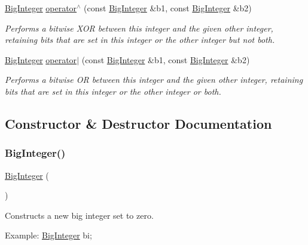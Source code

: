 \begin{DoxyCompactItemize}
\item 
\mbox{\hyperlink{classBigInteger}{Big\+Integer}} \mbox{\hyperlink{classBigInteger_a7a93a422d668c89ff99135bff3f3d6eb}{operator$^\wedge$}} (const \mbox{\hyperlink{classBigInteger}{Big\+Integer}} \&b1, const \mbox{\hyperlink{classBigInteger}{Big\+Integer}} \&b2)
\begin{DoxyCompactList}\small\item\em Performs a bitwise X\+OR between this integer and the given other integer, retaining bits that are set in this integer or the other integer but not both. \end{DoxyCompactList}\item 
\mbox{\hyperlink{classBigInteger}{Big\+Integer}} \mbox{\hyperlink{classBigInteger_ac175a35da208aba1aaddbfc60742f294}{operator$\vert$}} (const \mbox{\hyperlink{classBigInteger}{Big\+Integer}} \&b1, const \mbox{\hyperlink{classBigInteger}{Big\+Integer}} \&b2)
\begin{DoxyCompactList}\small\item\em Performs a bitwise OR between this integer and the given other integer, retaining bits that are set in this integer or the other integer or both. \end{DoxyCompactList}\end{DoxyCompactItemize}


\subsection{Constructor \& Destructor Documentation}
\mbox{\label{classBigInteger_a49b951f4a6687820741740806aa04715}} 
\subsubsection{\texorpdfstring{Big\+Integer()}{BigInteger()}\hspace{0.1cm}{\footnotesize\ttfamily [1/4]}}
{\footnotesize\ttfamily \mbox{\hyperlink{classBigInteger}{Big\+Integer}} (\begin{DoxyParamCaption}{ }\end{DoxyParamCaption})}



Constructs a new big integer set to zero. 

Example\+: \mbox{\hyperlink{classBigInteger}{Big\+Integer}} bi; \mbox{\label{classBigInteger_a2b2f122dc8513adcbf68d8b329834c9a}} 
